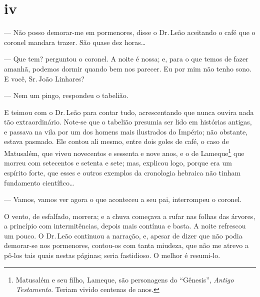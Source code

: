 \section*{iv}



--- Não posso demorar-me em pormenores, disse o Dr.\,Leão aceitando o
café que o coronel mandara trazer. São quase dez horas\ldots{}

--- Que tem? perguntou o coronel. A noite é nossa; e, para o que temos
de fazer amanhã, podemos dormir quando bem nos parecer. Eu por mim não
tenho sono. E você, Sr.\,João Linhares?

--- Nem um pingo, respondeu o tabelião.

E teimou com o Dr.\,Leão para contar tudo, acrescentando que nunca ouvira
nada tão extraordinário. Note-se que o tabelião presumia ser lido em
histórias antigas, e passava na vila por um dos homens mais ilustrados
do Império; não obstante, estava pasmado. Ele contou ali mesmo, entre
dois goles de café, o caso de Matusalém, que viveu novecentos e sessenta
e nove anos, e o de Lameque\footnote{Matusalém e seu filho, Lameque, são
  personagens do ``Gênesis'', \emph{Antigo Testamento}. Teriam vivido
  centenas de anos.} que morreu com setecentos e setenta e sete; mas,
explicou logo, porque era um espírito forte, que esses e outros exemplos
da cronologia hebraica não tinham fundamento científico\ldots{}

--- Vamos, vamos ver agora o que aconteceu a seu pai, interrompeu o
coronel.

O vento, de esfalfado, morrera; e a chuva começava a rufar nas folhas
das árvores, a princípio com intermitências, depois mais contínua e
basta. A noite refrescou um pouco. O Dr.\,Leão continuou a narração, e,
apesar de dizer que não podia demorar-se nos pormenores, contou-os com
tanta miudeza, que não me atrevo a pô-los tais quais nestas páginas;
seria fastidioso. O melhor é resumi-lo.

